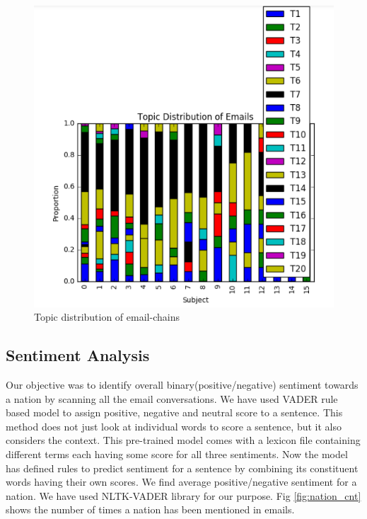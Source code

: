 \documentclass{article} %
\begin{document}
\begin{figure}
\center
\includegraphics[scale=0.5]{pix/topic.png}
\caption{Topic distribution of email-chains}
\label{fig:topicd}
\end{figure}

\subsection{Sentiment Analysis}

Our objective was to identify overall binary(positive/negative) sentiment towards a nation by scanning all the email conversations. We have used VADER rule based model to assign positive, negative and neutral score to a sentence. This method does not just look at individual words to score a sentence, but it also considers the context. This pre-trained model comes with a lexicon file containing different terms each having some score for all three sentiments. Now the model has defined rules to predict sentiment for a sentence by combining its constituent words having their own scores. We find average positive/negative sentiment for a nation. We have used NLTK-VADER library for our purpose. Fig \ref{fig:nation_cnt} shows the number of times a nation has been mentioned in emails.
\end{document}
